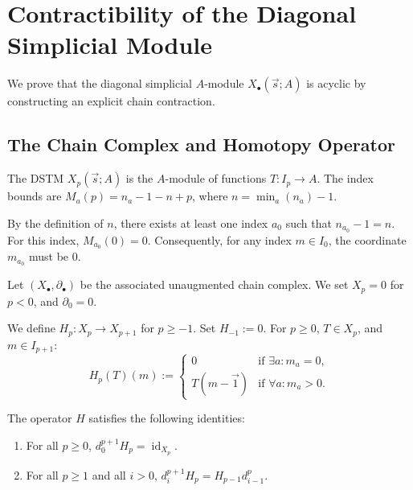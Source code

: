 \section{Contractibility of the Diagonal Simplicial Module}
\label{app:filtration}

We prove that the diagonal simplicial $A$-module $X_\bullet(\vec s; A)$ is acyclic by constructing an explicit chain contraction.

\subsection{The Chain Complex and Homotopy Operator}
The DSTM $X_p(\vec s; A)$ is the $A$-module of functions $T: I_p \to A$. The index bounds are $M_a(p) = n_a-1-n+p$, where $n = \min_a(n_a)-1$.

\begin{remark}[Index Bounds at $p=0$]\label{rem:index_bounds}
By the definition of $n$, there exists at least one index $a_0$ such that $n_{a_0}-1 = n$. 
For this index, $M_{a_0}(0) = 0$. Consequently, for any index $m \in I_0$, the coordinate $m_{a_0}$ must be 0.
\end{remark}

Let $(X_\bullet, \partial_\bullet)$ be the associated unaugmented chain complex. We set $X_p=0$ for $p<0$, and $\partial_0=0$.

\begin{definition}
We define $H_p: X_p \to X_{p+1}$ for $p\ge -1$. Set $H_{-1}:=0$. For $p\ge 0$, $T \in X_p$, and $m \in I_{p+1}$:
\[
H_p(T)(m) := \begin{cases}
0 & \text{if } \exists a: m_a = 0, \\
T(m-\vec{1}) & \text{if } \forall a: m_a > 0.
\end{cases}
\]
\end{definition}



\begin{lemma}\label{lem:homotopy_identities}
The operator $H$ satisfies the following identities:
\begin{enumerate}
    \item For all $p\ge 0$, $d_0^{p+1} H_p = \operatorname{id}_{X_p}$.
    \item For all $p\ge 1$ and all $i>0$, $d_i^{p+1} H_p = H_{p-1} d_{i-1}^p$.
\end{enumerate}
\end{lemma}



